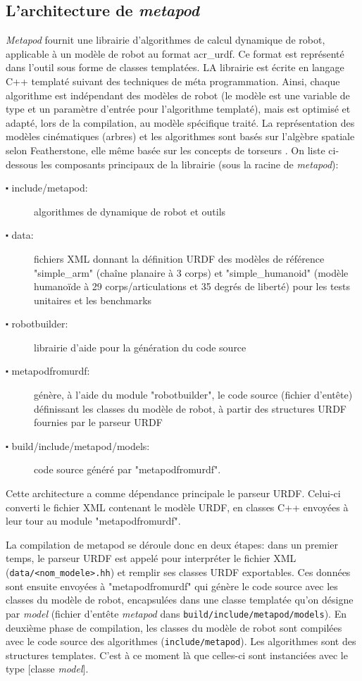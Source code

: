 \documentclass{report}
\begin{document}
\subsection{L'architecture de \emph{metapod}}

\emph{Metapod} fournit une librairie d'algorithmes de calcul dynamique de robot, applicable à un modèle de robot au format \gls{acr_urdf}. Ce format est représenté dans l'outil sous forme de classes templatées. LA librairie est écrite en langage C++ templaté suivant des techniques de méta programmation. Ainsi, chaque algorithme est indépendant des modèles de robot (le modèle est une variable de type et un paramètre d'entrée pour l'algorithme templaté), mais est optimisé et adapté, lors de la compilation, au modèle spécifique traité. La représentation des modèles cinématiques (arbres) et les algorithmes sont basés sur l'algèbre spatiale selon Featherstone, elle même basée sur les concepts de torseurs \cite{bib_featherstone}. On liste ci-dessous les composants principaux de la librairie (sous la racine de \emph{metapod}):
\begin{description}
\item[$\centerdot$ include/metapod:] algorithmes de dynamique de robot et outils
\item[$\centerdot$ data:] fichiers XML donnant la définition URDF des modèles de référence "simple\_arm" (chaîne planaire à 3 corps) et "simple\_humanoid" (modèle humanoïde à 29 corps/articulations et 35 degrés de liberté) pour les tests unitaires et les benchmarks
\item[$\centerdot$ robotbuilder:] librairie d'aide pour la génération du code source 
\item[$\centerdot$ metapodfromurdf:] génère, à l'aide du module "robotbuilder", le code source (fichier d'entête) définissant les classes du modèle de robot, à partir des structures URDF fournies par le parseur URDF
\item[$\centerdot$ build/include/metapod/models:] code source généré par "metapodfromurdf".
\end{description}

Cette architecture a comme dépendance principale le parseur URDF. Celui-ci converti le fichier XML contenant le modèle URDF, en classes C++ envoyées à leur tour au module "metapodfromurdf".

La compilation de metapod se déroule donc en deux étapes: dans un premier temps, le parseur URDF est appelé pour interpréter le fichier XML (\verb;data/<nom_modele>.hh;) et remplir ses classes URDF exportables. Ces données sont ensuite envoyées à "metapodfromurdf" qui génère le code source avec les classes du modèle de robot, encapsulées dans une classe templatée qu'on désigne par \emph{model} (fichier d'entête \emph{metapod} dans \verb;build/include/metapod/models;). En deuxième phase de compilation, les classes du modèle de robot sont compilées avec le code source des algorithmes (\verb;include/metapod;). Les algorithmes sont des structures templates. C'est à ce moment là que celles-ci sont instanciées avec le type [classe \emph{model}].
\end{document}
